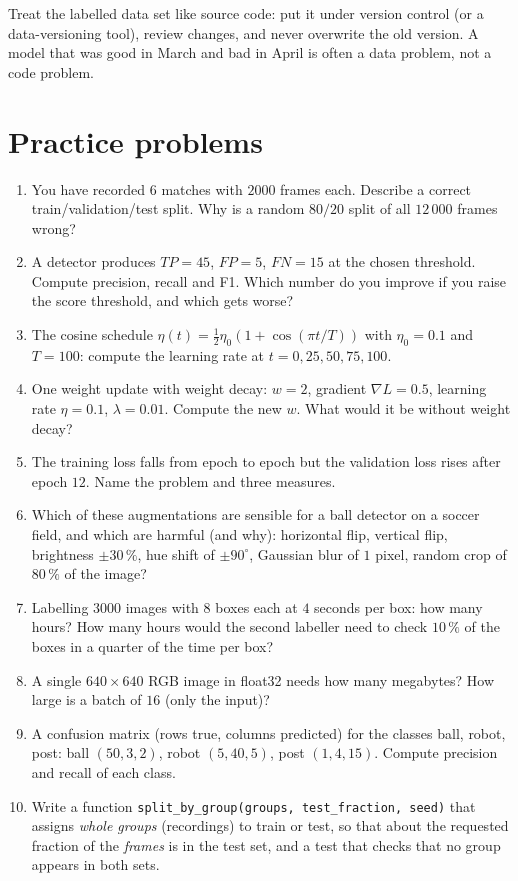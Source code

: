\begin{aibox}
Treat the labelled data set like source code: put it under version control (or a data-versioning tool), review changes, and never overwrite the old version. A model that was good in March and bad in April is often a data problem, not a code problem.
\end{aibox}

\section*{Practice problems}
\begin{enumerate}[label=\textbf{\thechapter.\arabic*}]
  \item You have recorded $6$ matches with $2000$ frames each. Describe a correct train/validation/test split. Why is a random $80/20$ split of all $12\,000$ frames wrong?
  \item A detector produces $TP=45$, $FP=5$, $FN=15$ at the chosen threshold. Compute precision, recall and F1. Which number do you improve if you raise the score threshold, and which gets worse?
  \item The cosine schedule $\eta(t)=\tfrac12\eta_0(1+\cos(\pi t/T))$ with $\eta_0=0.1$ and $T=100$: compute the learning rate at $t=0,25,50,75,100$.
  \item One weight update with weight decay: $w=2$, gradient $\nabla L=0.5$, learning rate $\eta=0.1$, $\lambda=0.01$. Compute the new $w$. What would it be without weight decay?
  \item The training loss falls from epoch to epoch but the validation loss rises after epoch $12$. Name the problem and three measures.
  \item Which of these augmentations are sensible for a ball detector on a soccer field, and which are harmful (and why): horizontal flip, vertical flip, brightness $\pm30\,\%$, hue shift of $\pm90^\circ$, Gaussian blur of $1$ pixel, random crop of $80\,\%$ of the image?
  \item Labelling $3000$ images with $8$ boxes each at $4$ seconds per box: how many hours? How many hours would the second labeller need to check $10\,\%$ of the boxes in a quarter of the time per box?
  \item A single $640\times640$ RGB image in float32 needs how many megabytes? How large is a batch of $16$ (only the input)?
  \item A confusion matrix (rows true, columns predicted) for the classes ball, robot, post: ball $(50,3,2)$, robot $(5,40,5)$, post $(1,4,15)$. Compute precision and recall of each class.
  \item[\textbf{\thechapter.10}$\star$] Write a function \texttt{split\_by\_group(groups, test\_fraction, seed)} that assigns \emph{whole groups} (recordings) to train or test, so that about the requested fraction of the \emph{frames} is in the test set, and a test that checks that no group appears in both sets.
\end{enumerate}

